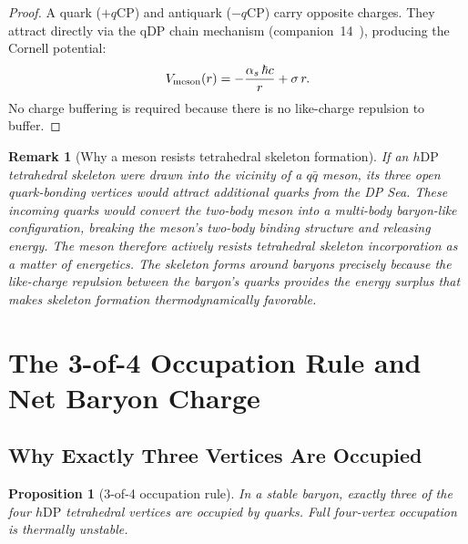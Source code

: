 \documentclass[12pt]{article}
\newtheorem{proposition}[theorem]{Proposition}
\newtheorem{remark}[theorem]{Remark}
\newcommand{\qCP}{q\mathrm{CP}}
\newcommand{\hDP}{h\mathrm{DP}}
\newcommand{\as}{\alpha_s}
\begin{document}
\begin{proof}
A quark ($+\qCP$) and antiquark ($-\qCP$) carry opposite charges.
They attract directly via the qDP chain mechanism (companion~14~\cite{c14}),
producing the Cornell potential:
\begin{equation}
V_{\rm meson}(r) = -\frac{\as\,\hbar c}{r} + \sigma\,r.
\end{equation}
No charge buffering is required because there is no like-charge
repulsion to buffer.
\end{proof}

\begin{remark}[Why a meson resists tetrahedral skeleton formation]
If an $\hDP$ tetrahedral skeleton were drawn into the vicinity of a
$q\bar{q}$ meson, its three open quark-bonding vertices would attract
additional quarks from the DP Sea.  These incoming quarks would
convert the two-body meson into a multi-body baryon-like configuration,
breaking the meson's two-body binding structure and releasing energy.
The meson therefore actively resists tetrahedral skeleton incorporation
as a matter of energetics.  The skeleton forms around baryons precisely
because the like-charge repulsion between the baryon's quarks provides
the energy surplus that makes skeleton formation thermodynamically
favorable.
\end{remark}

\section{The 3-of-4 Occupation Rule and Net Baryon Charge}
\label{sec:occupation}

\subsection{Why Exactly Three Vertices Are Occupied}

\begin{proposition}[3-of-4 occupation rule]
\label{prop:three_of_four}
In a stable baryon, exactly three of the four $\hDP$ tetrahedral
vertices are occupied by quarks.  Full four-vertex occupation is
thermally unstable.
\end{proposition}
\end{document}
